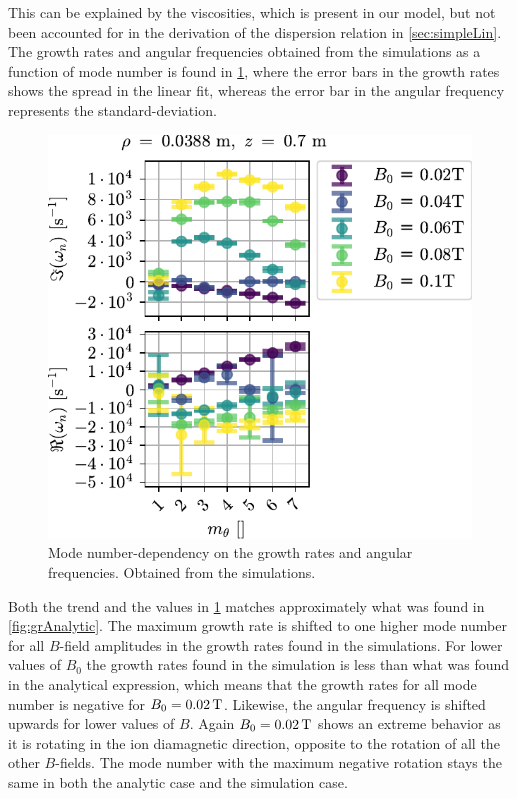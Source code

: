 %
This can be explained by the viscosities, which is present in our model, but not been accounted for in the derivation of the dispersion relation in \cref{sec:simpleLin}.
The growth rates and angular frequencies obtained from the simulations as a function of mode number is found in \cref{fig:grB}, where the error bars in the growth rates shows the spread in the linear fit, whereas the error bar in the angular frequency represents the standard-deviation.
%
\begin{figure}[htb]
        \centering
        \includegraphics{fig/results/growthRates/growthRatesB0}
        \caption{Mode number-dependency on the growth rates and angular frequencies.
            Obtained from the simulations.}
        \label{fig:grB}
\end{figure}
%
Both the trend and the values in \cref{fig:grB} matches approximately what was found in \cref{fig:grAnalytic}.
The maximum growth rate is shifted to one higher mode number for all $B$-field amplitudes in the growth rates found in the simulations.
For lower values of $B_0$ the growth rates found in the simulation is less than what was found in the analytical expression, which means that the growth rates for all mode number is negative for $B_0=0.02\, \text{T}$.
Likewise, the angular frequency is shifted upwards for lower values of $B$.
Again $B_0=0.02\, \text{T}$ shows an extreme behavior as it is rotating in the ion diamagnetic direction, opposite to the rotation of all the other $B$-fields.
The mode number with the maximum negative rotation stays the same in both the analytic case and the simulation case.


